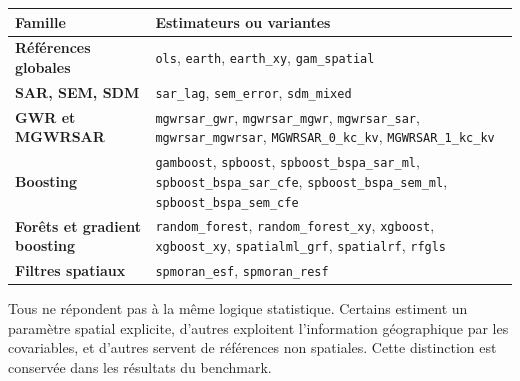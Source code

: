 \documentclass[11pt,a4paper]{article}
\begin{document}
\begin{center}
\scriptsize
\begin{tabularx}{\textwidth}{>{\bfseries}p{3.2cm}X}
\toprule
Famille & Estimateurs ou variantes \\
\midrule
Références globales & \texttt{ols}, \texttt{earth}, \texttt{earth\_xy}, \texttt{gam\_spatial} \\
SAR, SEM, SDM & \texttt{sar\_lag}, \texttt{sem\_error}, \texttt{sdm\_mixed} \\
GWR et MGWRSAR & \texttt{mgwrsar\_gwr}, \texttt{mgwrsar\_mgwr}, \texttt{mgwrsar\_sar}, \texttt{mgwrsar\_mgwrsar}, \texttt{MGWRSAR\_0\_kc\_kv}, \texttt{MGWRSAR\_1\_kc\_kv} \\
Boosting & \texttt{gamboost}, \texttt{spboost}, \texttt{spboost\_bspa\_sar\_ml}, \texttt{spboost\_bspa\_sar\_cfe}, \texttt{spboost\_bspa\_sem\_ml}, \texttt{spboost\_bspa\_sem\_cfe} \\
Forêts et gradient boosting & \texttt{random\_forest}, \texttt{random\_forest\_xy}, \texttt{xgboost}, \texttt{xgboost\_xy}, \texttt{spatialml\_grf}, \texttt{spatialrf}, \texttt{rfgls} \\
Filtres spatiaux & \texttt{spmoran\_esf}, \texttt{spmoran\_resf} \\
\bottomrule
\end{tabularx}
\end{center}

Tous ne répondent pas à la même logique statistique. Certains estiment un paramètre spatial explicite, d'autres exploitent l'information géographique par les covariables, et d'autres servent de références non spatiales. Cette distinction est conservée dans les résultats du benchmark.
\end{document}
